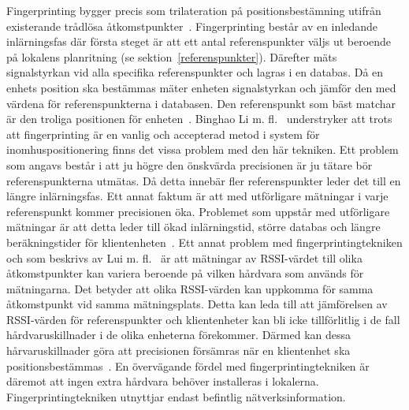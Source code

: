 \documentclass[a4paper,12pt]{article}
\begin{document}
 Fingerprinting bygger precis som trilateration på positionsbestämning utifrån existerande trådlösa åtkomstpunkter~\cite{jun2018low}. Fingerprinting består av en inledande inlärningsfas där första steget är att ett antal referenspunkter väljs ut beroende på lokalens planritning (se sektion~\ref{referenspunkter}). Därefter mäts signalstyrkan vid alla specifika referenspunkter och lagras i en databas.
 Då en enhets position ska bestämmas mäter enheten signalstyrkan och jämför den med värdena för referenspunkterna i databasen. Den referenspunkt som bäst matchar är den troliga positionen för enheten~\cite{IP1,jun2018low}.
 Binghao Li m. fl.~\cite{IP1} understryker att trots att fingerprinting är en vanlig och accepterad metod i system för inomhuspositionering finns det vissa problem med den här tekniken.
 Ett problem som angavs består i att ju högre den önskvärda precisionen är ju tätare bör referenspunkterna utmätas. Då detta innebär fler referenspunkter leder det till en längre inlärningsfas. Ett annat faktum är att med utförligare mätningar i varje referenspunkt kommer precisionen öka. Problemet som uppstår med utförligare mätningar är att detta leder till ökad inlärningstid, större databas och längre beräkningstider för klientenheten~\cite{IP1}. Ett annat problem med fingerprintingtekniken och som beskrivs av Lui m. fl.~\cite{problem_with_RSSI} är att mätningar av RSSI-värdet till olika åtkomstpunkter kan variera beroende på vilken hårdvara som används för mätningarna. Det betyder att olika RSSI-värden kan uppkomma för samma åtkomstpunkt vid samma mätningsplats. Detta kan leda till att jämförelsen av RSSI-värden för referenspunkter och klientenheter kan bli icke tillförlitlig i de fall hårdvaruskillnader i de olika enheterna förekommer. Därmed kan dessa hårvaruskillnader göra att precisionen försämras när en klientenhet ska positionsbestämmas~\cite{problem_with_RSSI}. En övervägande fördel med fingerprintingtekniken är däremot att ingen extra hårdvara behöver installeras i lokalerna. Fingerprintingtekniken utnyttjar endast befintlig nätverksinformation.
\end{document}
